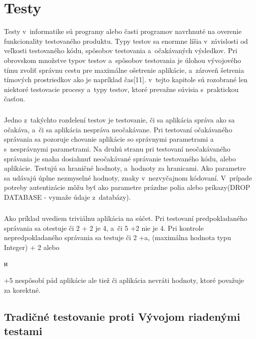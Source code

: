 \documentclass[
  digital, %
  table,   %
oneside,
  nolof,     %
  nolot,     %
]{fithesis3}
\begin{document}
\chapter{Testy}
Testy v~informatike sú programy alebo časti programov navrhnuté na overenie funkcionality testovaného produktu. Typy testov sa enormne líšia v~závislosti od veľkosti testovaného kódu, spôsobov testovania a~očakávaných výsledkov. Pri obrovskom množstve typov testov a~spôsobov testovania je úlohou vývojového tímu zvoliť správnu cestu pre maximálne ošetrenie aplikácie, a~zároveň šetrenia tímových prostriedkov ako je napríklad čas[11].  v~tejto kapitole sú rozobrané len niektoré testovacie procesy a~typy testov, ktoré prevažne súvisia s~praktickou časťou.\paragraph{}
Jedno z~takýchto rozdelení testov je  testovanie, či sa aplikácia správa ako sa očakáva, a~či sa aplikácia nespráva neočakávane. Pri testovaní očakávaného správania sa pozoruje chovanie aplikácie so správnymi parametrami a~ s~nesprávnymi parametrami. Na druhú stranu pri testovaní neočakávaného správania je snaha dosiahnuť neočakávané správanie  testovaného kódu, alebo aplikácie. Testujú sa hraničné hodnoty, a~hodnoty za hranicami. Ako parametre sa udávajú úplne nezmyselné hodnoty, znaky v~nezvyčajnom kódovaní. V~prípade potreby autentizácie môžu byť ako parametre prázdne polia alebo príkazy(DROP DATABASE - vymaže údaje z~databázy). \paragraph{}
Ako príklad uvediem triviálnu aplikácia na súčet. Pri testovaní predpokladaného správania sa otestuje či 2 + 2 je 4, a~či 5 +2 nie je 4. Pri kontrole nepredpokladaného správania sa testuje či 2 +a, (maximálna hodnota typu Integer) + 2 alebo \begin{otherlanguage}{russian} и \end{otherlanguage}  +5   nespôsobí pád aplikácie ale tiež či aplikácia nevráti hodnoty, ktoré považuje za korektné. \paragraph{}

\section{Tradičné testovanie proti Vývojom riadenými testami}
\end{document}
